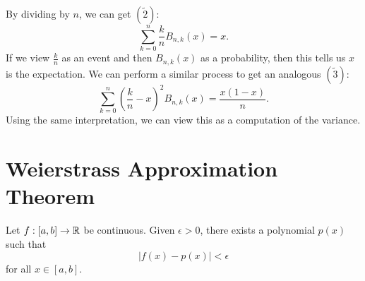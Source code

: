 \begin{remark}
  By dividing by $n$, we can get $(\widetilde{2})$:
  \[
    \sum_{k = 0}^n \frac{k}{n} B_{n, k}(x) = x
  .\]
  If we view $\frac{k}{n}$ as an event and
  then $B_{n, k}(x)$ as a probability, then this tells us
  $x$ is the expectation. We can perform a similar
  process to get an analogous $(\widetilde{3})$:
  \[
    \sum_{k = 0}^n \left(\frac{k}{n} - x\right)^2 B_{n, k}(x) = \frac{x(1 - x)}{n}
  .\]
  Using the same interpretation, we can view this
  as a computation of the variance.
\end{remark}

\section{Weierstrass Approximation Theorem}

\begin{theorem}
  Let $f : [a, b] \to \mathbb{R}$ be continuous. Given
  $\epsilon > 0$, there exists a polynomial $p(x)$ such
  that
  \[
    |f(x) - p(x)| < \epsilon
  \]
  for all $x \in [a, b]$.
\end{theorem}

